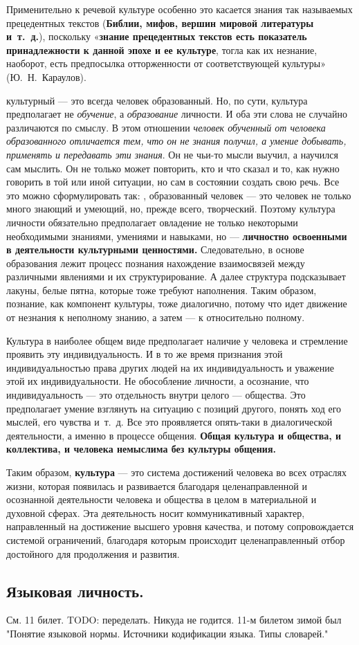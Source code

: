 Применительно к речевой культуре особенно это касается знания так называемых прецедентных текстов (\textbf{Библии, мифов, вершин мировой литературы и~т.~д.}), поскольку «\textbf{знание прецедентных текстов есть показатель принадлежности к данной эпохе и ее культуре}, тогла как их незнание, наоборот, есть предпосылка отторженности от соответствующей культуры» (Ю.~Н.~Караулов).

{ культурный --- это всегда человек образованный}.
Но, по сути, культура предполагает не \textit{обучение}, а \textit{образование} личности.
И оба эти слова не случайно различаются по смыслу.
В этом отношении \textit{человек обученный от человека образованного отличается тем, что он не знания получил, а умение добывать, применять и передавать эти знания}.
Он не чьи-то мысли выучил, а научился сам мыслить.
Он не только может повторить, кто и что сказал и то, как нужно говорить в той или иной ситуации, но сам в состоянии создать свою речь.
Все это можно сформулировать так: {, образованный человек --- это человек не только много знающий и умеющий, но, прежде всего, творческий}.
Поэтому культура личности обязательно предполагает овладение не только некоторыми необходимыми знаниями, умениями и навыками, но --- {\bfseries личностно освоенными в деятельности культурными ценностями.}
Следовательно, в основе образования лежит процесс познания нахождение взаимосвязей между различными явлениями и их структурирование.
А далее структура подсказывает лакуны, белые пятна, которые тоже требуют наполнения.
Таким образом, познание, как компонент культуры, тоже диалогично, потому что идет движение от незнания к неполному знанию, а затем --- к относительно полному.

Культура в наиболее общем виде предполагает наличие {} у человека и стремление проявить эту индивидуальность.
И в то же время признания этой индивидуальностью права других людей на их индивидуальность и уважение этой их индивидуальности.
Не обособление личности, а осознание, что индивидуальность --- это отдельность внутри целого --- общества.
Это предполагает умение взглянуть на ситуацию с позиций другого, понять ход его мыслей, его чувства и~т.~д.
Все это проявляется опять-таки в диалогической деятельности, а именно в процессе общения.
\textbf{Общая культура и общества, и коллектива, и человека немыслима без культуры общения.}

Таким образом, \textbf{культура} --- это система достижений человека во всех отраслях жизни, которая появилась и развивается благодаря целенаправленной и осознанной деятельности человека и общества в целом в материальной и духовной сферах.
Эта деятельность носит { коммуникативный характер}, направленный на достижение высшего уровня качества, и потому сопровождается системой ограничений, благодаря которым происходит целенаправленный отбор достойного для продолжения и развития. 

\subsection*{Языковая личность.}

См. 11 билет. TODO: переделать. Никуда не годится. 11-м билетом зимой был "Понятие языковой нормы. Источники кодификации
языка. Типы словарей."
